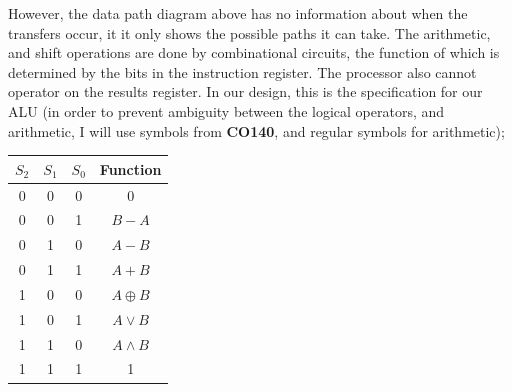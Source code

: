 \documentclass[a4paper, 12pt]{article}
\begin{document}
            However, the data path diagram above has no information about when the transfers occur, it it only shows the possible paths it can take. The arithmetic, and shift operations are done by combinational circuits, the function of which is determined by the bits in the instruction register. The processor also cannot operator on the results register. In our design, this is the specification for our ALU (in order to prevent ambiguity between the logical operators, and arithmetic, I will use symbols from \textbf{CO140}, and regular symbols for arithmetic);
            \begin{center}
                \begin{tabular}{c|c|c||c}
                    $S_2$ & $S_1$ & $S_0$ & Function \\
                    \hline
                    0 & 0 & 0 & 0 \\
                    0 & 0 & 1 & $B - A$ \\
                    0 & 1 & 0 & $A - B$ \\
                    0 & 1 & 1 & $A + B$ \\
                    1 & 0 & 0 & $A \oplus B$ \\
                    1 & 0 & 1 & $A \lor B$ \\
                    1 & 1 & 0 & $A \land B$ \\
                    1 & 1 & 1 & 1
                \end{tabular}
            \end{center}
\end{document}
